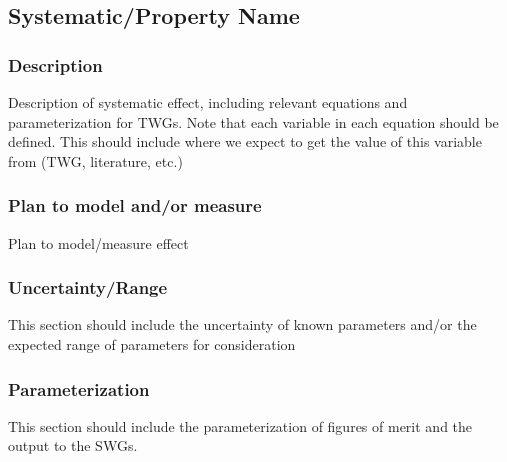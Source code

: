 \subsection{Systematic/Property Name}

\subsubsection{Description}
Description of systematic effect, including relevant equations and
parameterization for TWGs. Note that each variable in each equation should be
defined. This should include where we expect to get the value of this variable
from (TWG, literature, etc.)

\subsubsection{Plan to model and/or measure}
Plan to model/measure effect

\subsubsection{Uncertainty/Range}
This section should include the uncertainty of
known parameters and/or the expected range of parameters for consideration

\subsubsection{Parameterization}
This section should include the parameterization of figures of
merit and the output to the SWGs.
